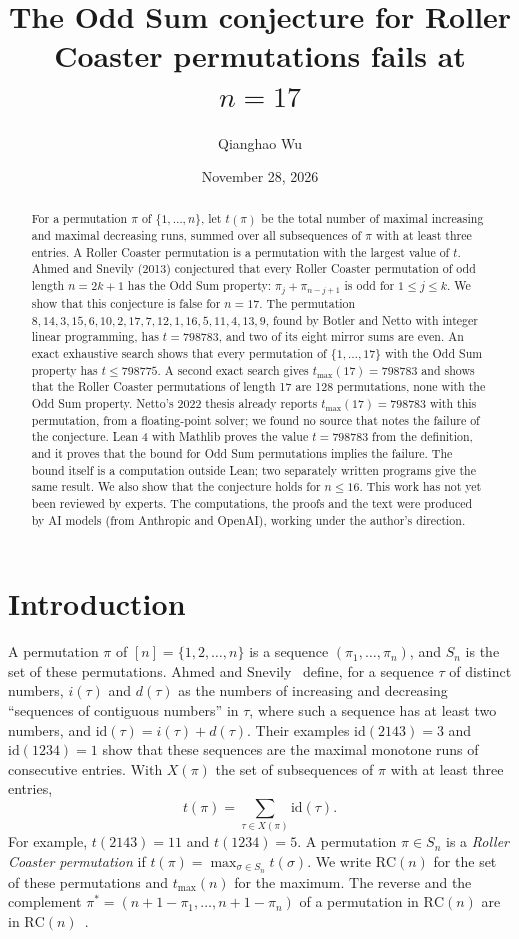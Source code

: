 \documentclass[11pt]{article}
\title{The Odd Sum conjecture for Roller Coaster permutations fails at $n = 17$}
\author{Qianghao Wu}
\date{November 28, 2026}
\theoremstyle{remark}
\newcommand{\RC}{\mathrm{RC}}
\newcommand{\tmax}{t_{\max}}
\begin{document}
\maketitle

\begin{abstract}
For a permutation $\pi$ of $\{1,\dots,n\}$, let $t(\pi)$ be the total number of maximal increasing and maximal decreasing runs, summed over all subsequences of $\pi$ with at least three entries. A Roller Coaster permutation is a permutation with the largest value of $t$. Ahmed and Snevily (2013) conjectured that every Roller Coaster permutation of odd length $n = 2k+1$ has the Odd Sum property: $\pi_j + \pi_{n-j+1}$ is odd for $1 \le j \le k$. We show that this conjecture is false for $n = 17$. The permutation $8, 14, 3, 15, 6, 10, 2, 17, 7, 12, 1, 16, 5, 11, 4, 13, 9$, found by Botler and Netto with integer linear programming, has $t = 798783$, and two of its eight mirror sums are even. An exact exhaustive search shows that every permutation of $\{1,\dots,17\}$ with the Odd Sum property has $t \le 798775$. A second exact search gives $\tmax(17) = 798783$ and shows that the Roller Coaster permutations of length 17 are 128 permutations, none with the Odd Sum property. Netto's 2022 thesis already reports $\tmax(17) = 798783$ with this permutation, from a floating-point solver; we found no source that notes the failure of the conjecture. Lean 4 with Mathlib proves the value $t = 798783$ from the definition, and it proves that the bound for Odd Sum permutations implies the failure. The bound itself is a computation outside Lean; two separately written programs give the same result. We also show that the conjecture holds for $n \le 16$. This work has not yet been reviewed by experts. The computations, the proofs and the text were produced by AI models (from Anthropic and OpenAI), working under the author's direction.
\end{abstract}

\section{Introduction}

A permutation $\pi$ of $[n] = \{1, 2, \dots, n\}$ is a sequence $(\pi_1, \dots, \pi_n)$, and $S_n$ is the set of these permutations. Ahmed and Snevily~\cite{AS} define, for a sequence $\tau$ of distinct numbers, $i(\tau)$ and $d(\tau)$ as the numbers of increasing and decreasing ``sequences of contiguous numbers'' in $\tau$, where such a sequence has at least two numbers, and $\mathrm{id}(\tau) = i(\tau) + d(\tau)$. Their examples $\mathrm{id}(2143) = 3$ and $\mathrm{id}(1234) = 1$ show that these sequences are the maximal monotone runs of consecutive entries. With $X(\pi)$ the set of subsequences of $\pi$ with at least three entries,
\[
  t(\pi) = \sum_{\tau \in X(\pi)} \mathrm{id}(\tau).
\]
For example, $t(2143) = 11$ and $t(1234) = 5$. A permutation $\pi \in S_n$ is a \emph{Roller Coaster permutation} if $t(\pi) = \max_{\sigma \in S_n} t(\sigma)$. We write $\RC(n)$ for the set of these permutations and $\tmax(n)$ for the maximum. The reverse and the complement $\pi^* = (n+1-\pi_1, \dots, n+1-\pi_n)$ of a permutation in $\RC(n)$ are in $\RC(n)$~\cite{AS}.
\end{document}
